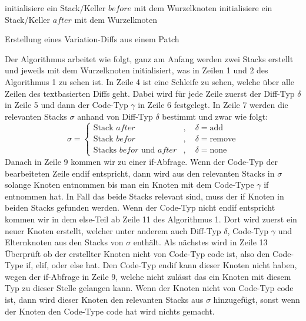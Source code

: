 \begin{algorithm}[H]
	\SetAlgoLined
	\DontPrintSemicolon
	initialisiere ein Stack/Keller $before$ mit dem Wurzelknoten\;
	initialisiere ein Stack/Keller $after$ mit dem Wurzelknoten\;
	\;
	\caption{Erstellung eines Variation-Diffs aus einem Patch}
\end{algorithm}
Der Algorithmus arbeitet wie folgt, ganz am Anfang werden zwei Stacks erstellt und jeweils mit dem Wurzelknoten initialisiert, was in Zeilen 1 und 2 des Algorithmus 1 zu sehen ist. In Zeile 4 ist eine Schleife zu sehen, welche über alle Zeilen des textbasierten Diffs geht. Dabei wird für jede Zeile zuerst der Diff-Typ $\delta$ in Zeile 5 und dann der Code-Typ $\gamma$ in Zeile 6 festgelegt. In Zeile 7 werden die relevanten Stacks $\sigma$ anhand von Diff-Typ $\delta$ bestimmt und zwar wie folgt:
\[ \sigma =
\begin{cases}
	\text{Stack } after      &, \quad \delta = \text{add}\\
	\text{Stack } befor  &, \quad \delta = \text{remove}\\
	\text{Stacks } befor \text{ und } after &, \quad \delta = \text{none}
\end{cases}
\]
Danach in Zeile 9 kommen wir zu einer if-Abfrage. Wenn der Code-Typ der bearbeiteten Zeile endif entspricht, dann wird aus den relevanten Stacks in $\sigma$ solange Knoten entnommen bis man ein Knoten mit dem Code-Type $\gamma$ if entnommen hat. In Fall das beide Stacks relevant sind, muss der if Knoten in beiden Stacks gefunden werden. Wenn der Code-Typ nicht endif entspricht kommen wir in dem else-Teil ab Zeile 11 des Algorithmus 1. Dort wird zuerst ein neuer Knoten erstellt, welcher unter anderem auch Diff-Typ $\delta$, Code-Typ $\gamma$ und Elternknoten aus den Stacks von $\sigma$ enthält. Als nächstes wird in Zeile 13 Überprüft ob der erstellter Knoten nicht von Code-Typ code ist, also den Code-Type if, elif, oder else hat. Den Code-Typ endif kann dieser Knoten nicht haben, wegen der if-Abfrage in Zeile 9, welche nicht zulässt das ein Knoten mit diesem Typ zu dieser Stelle gelangen kann. Wenn der Knoten nicht von Code-Typ code ist, dann wird dieser Knoten den relevanten Stacks aus $\sigma$ hinzugefügt, sonst wenn der Knoten den Code-Type code hat wird nichts gemacht.\\



